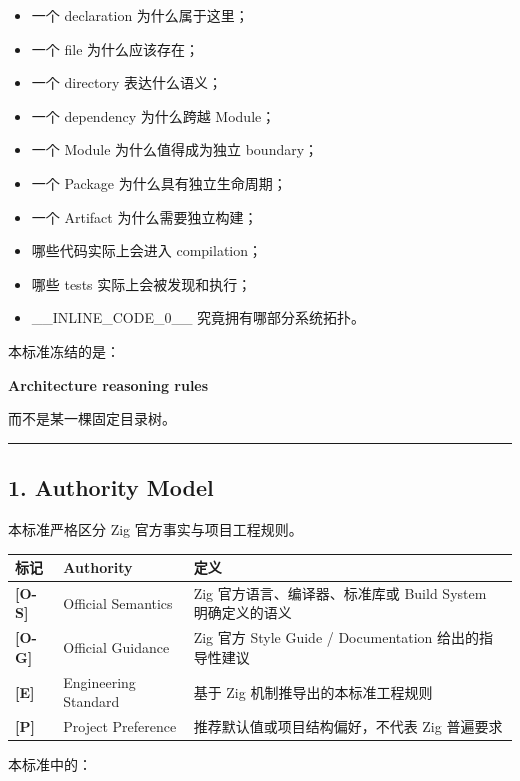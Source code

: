 \documentclass[11pt,a4paper]{article}
\begin{document}
\begin{itemize}
  \item 一个 declaration 为什么属于这里；
  \item 一个 file 为什么应该存在；
  \item 一个 directory 表达什么语义；
  \item 一个 dependency 为什么跨越 Module；
  \item 一个 Module 为什么值得成为独立 boundary；
  \item 一个 Package 为什么具有独立生命周期；
  \item 一个 Artifact 为什么需要独立构建；
  \item 哪些代码实际上会进入 compilation；
  \item 哪些 tests 实际上会被发现和执行；
  \item \_\_INLINE\_CODE\_0\_\_ 究竟拥有哪部分系统拓扑。
\end{itemize}
本标准冻结的是：

\begin{gfmBlockquote}
\textbf{Architecture reasoning rules}
\end{gfmBlockquote}
而不是某一棵固定目录树。

\vspace{0.5em}\hrule\vspace{0.5em}
\subsection{1. Authority Model}
本标准严格区分 Zig 官方事实与项目工程规则。

\begin{table}[htbp]
\centering
\small
\begin{tabularx}{\textwidth}{| X | X | X |}
\hline
\rowcolor{codebg}
\textbf{标记} & \textbf{Authority} & \textbf{定义} \\ \hline
\textbf{[O-S]} & Official Semantics & Zig 官方语言、编译器、标准库或 Build System 明确定义的语义 \\ \hline
\rowcolor{codebg!50} \textbf{[O-G]} & Official Guidance & Zig 官方 Style Guide / Documentation 给出的指导性建议 \\ \hline
\textbf{[E]} & Engineering Standard & 基于 Zig 机制推导出的本标准工程规则 \\ \hline
\rowcolor{codebg!50} \textbf{[P]} & Project Preference & 推荐默认值或项目结构偏好，不代表 Zig 普遍要求 \\ \hline
\end{tabularx}
\end{table}
本标准中的：
\end{document}
